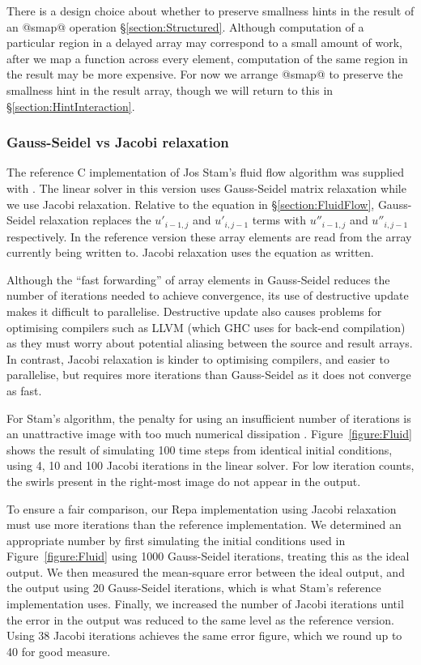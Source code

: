 There is a design choice about whether to preserve smallness hints in the result of an @smap@ operation \S\ref{section:Structured}. Although computation of a particular region in a delayed array may correspond to a small amount of work, after we map a function across every element, computation of the same region in the result may be more expensive. For now we arrange @smap@ to preserve the smallness hint in the result array, though we will return to this in \S\ref{section:HintInteraction}.


\subsubsection{Gauss-Seidel vs Jacobi relaxation}
\label{section:Relaxation}
The reference C implementation of Jos Stam's fluid flow algorithm was supplied with \cite{Stam:StableFluids}. The linear solver in this version uses Gauss-Seidel matrix relaxation while we use Jacobi relaxation. Relative to the equation in \S\ref{section:FluidFlow}, Gauss-Seidel relaxation replaces the $u'_{i-1,j}$ and $u'_{i,j-1}$ terms with $u''_{i-1,j}$ and $u''_{i,j-1}$ respectively. In the reference version these array elements are read from the array currently being written to. Jacobi relaxation uses the equation as written. 

Although the ``fast forwarding'' of array elements in Gauss-Seidel reduces the number of iterations needed to achieve convergence, its use of destructive update makes it difficult to parallelise. Destructive update also causes problems for optimising compilers such as LLVM (which GHC uses for back-end compilation) as they must worry about potential aliasing between the source and result arrays. In contrast, Jacobi relaxation is kinder to optimising compilers, and easier to parallelise, but requires more iterations than Gauss-Seidel as it does not converge as fast.

For Stam's algorithm, the penalty for using an insufficient number of iterations is an unattractive image with too much numerical dissipation \cite{Stam:StableFluids}. Figure~\ref{figure:Fluid} shows the result of simulating 100 time steps from identical initial conditions, using 4, 10 and 100 Jacobi iterations in the linear solver. For low iteration counts, the swirls present in the right-most image do not appear in the output.

To ensure a fair comparison, our Repa implementation using Jacobi relaxation must use more iterations than the reference implementation. We determined an appropriate number by first simulating the initial conditions used in Figure~\ref{figure:Fluid} using 1000 Gauss-Seidel iterations, treating this as the ideal output. We then measured the mean-square error between the ideal output, and the output using 20 Gauss-Seidel iterations, which is what Stam's reference implementation uses. Finally, we increased the number of Jacobi iterations until the error in the output was reduced to the same level as the reference version. Using 38 Jacobi iterations achieves the same error figure, which we round up to 40 for good measure.



